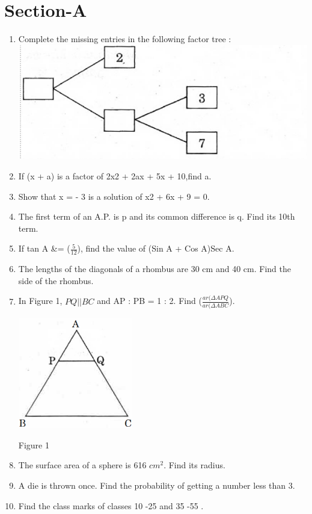 \documentclass[journal,12pt,twocolumn]{IEEEtran}
\begin{document}
\section{Section-A}
\renewcommand{\theequation}{\theenumi}
\begin{enumerate}
\item Complete the missing entries in the following factor tree :\\
\includegraphics[width=\columnwidth, center]{1.png}
\label{fig:Line between A and B}
\item If (x + a) is a factor of 2x2 + 2ax + 5x + 10,find a.\\
\item  Show that x = - 3 is a solution of x2 + 6x + 9 = 0.\\
\item The first term of an A.P. is p and its common difference is q. Find its 10th term. \\
\item If tan A &= ($\frac{5}{12}$), find the value of (Sin A + Cos A)Sec A.\\
\item The lengths of the diagonals of a rhombus are 30 cm and 40 cm. Find the side of the rhombus. \\
\item In Figure 1, $PQ||BC$ and AP : PB = 1 : 2. Find ($\frac{ar(\Delta APQ}{ar(\Delta ABC}$).\\
{\centering
    \includegraphics[width=5cm, center]{2.png}
    \caption{Figure 1 \\ }
    \label{Some label}}
\item The surface area of a sphere is 616 $cm^2$. Find its radius.\\
\item A die is thrown once. Find the probability of getting a number less than 3.\\  
\item Find the class marks of classes 10 -25 and 35 -55 . \\

\end{enumerate}
\end{document}
